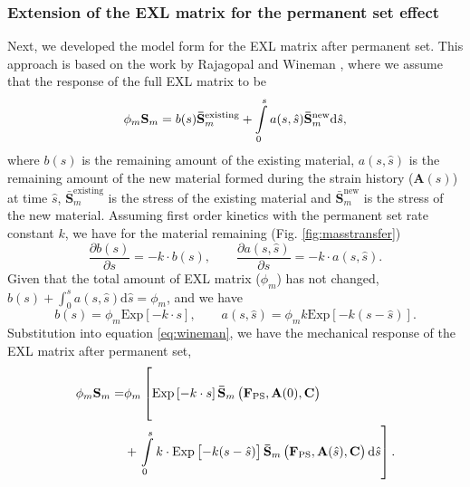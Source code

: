 
\subsubsection{Extension of the EXL matrix for the permanent set effect}

	Next, we developed the model form for the EXL matrix after permanent set. This approach is based on the work by Rajagopal and Wineman \cite{rajagopal_constitutive_1992}, where we assume that the response of the full EXL matrix to be 
\begin{equation} \label{eq:wineman}
\phi_m \mathbf{S}_m = b(s)\mathbf{\bar{S}}_m^\mathrm{existing} + \int\displaylimits_0^s a(s,\hat{s})\mathbf{\bar{S}}_m^\mathrm{new} \mathrm{d}\hat{s},
\end{equation}
    where $b(s)$ is the remaining amount of the existing material, $a(s,\hat{s})$ is the remaining amount of the new material formed during the strain history ($\mathbf{A}(s)$) at time $\hat{s}$, $\mathbf{\bar{S}}_m^\mathrm{existing}$ is the stress of the existing material and $\mathbf{\bar{S}}_m^\mathrm{new}$ is the stress of the new material. Assuming first order kinetics with the permanent set rate constant $k $, we have for the material remaining (Fig. \ref{fig:masstransfer})
\begin{equation}
\frac{\partial b(s)}{\partial s} = - k\cdot b(s), \qquad \frac{\partial a(s,\hat{s})}{\partial s} = - k \cdot a(s,\hat{s}).
\end{equation}
    Given that the total amount of EXL matrix ($\phi_m$) has not changed, $b(s) + \int_0^s a(s, \hat{s}) \mathrm{d}\hat{s} = \phi_m$, and we have
\begin{equation}
b(s) = \phi_m \mathrm{Exp}\left[-k  \cdot s\right], \qquad a(s,\hat{s}) = \phi_m k  \mathrm{Exp}\left[-k (s - \hat{s})\right].
\end{equation}
    Substitution into equation \ref{eq:wineman}, we have the mechanical response of the EXL matrix after permanent set,
\begin{equation}
\begin{aligned}
\phi_m \mathbf{S}_m =& \phi_m \left[\mathrm{Exp}\left[-k  \cdot s\right]\mathbf{\bar{S}}_m \left(\mathbf{F}_\mathrm{PS},\mathbf{A}(0),\mathbf{C}\right) \phantom{\int\displaylimits_0^s} \right. \\
&+ \left. \int\displaylimits_0^s k \cdot \mathrm{Exp}\left[-k (s - \hat{s})\right] \mathbf{\bar{S}}_m \left(\mathbf{F}_\mathrm{PS},  \mathbf{A}(\hat{s}),\mathbf{C}\right) \mathrm{d}\hat{s} \right].
\end{aligned}
\end{equation}

